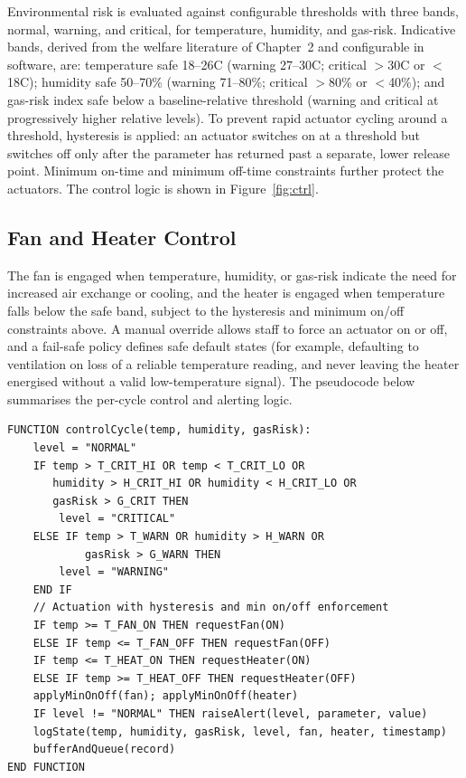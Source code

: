 \documentclass[12pt,a4paper]{report}
\begin{document}
Environmental risk is evaluated against configurable thresholds with three bands, normal, warning, and critical, for temperature, humidity, and gas-risk. Indicative bands, derived from the welfare literature of Chapter~2 and configurable in software, are: temperature safe 18--26\textdegree C (warning 27--30\textdegree C; critical $>$30\textdegree C or $<$18\textdegree C); humidity safe 50--70\% (warning 71--80\%; critical $>$80\% or $<$40\%); and gas-risk index safe below a baseline-relative threshold (warning and critical at progressively higher relative levels). To prevent rapid actuator cycling around a threshold, hysteresis is applied: an actuator switches on at a threshold but switches off only after the parameter has returned past a separate, lower release point. Minimum on-time and minimum off-time constraints further protect the actuators. The control logic is shown in Figure~\ref{fig:ctrl}.

\subsection{Fan and Heater Control}

The fan is engaged when temperature, humidity, or gas-risk indicate the need for increased air exchange or cooling, and the heater is engaged when temperature falls below the safe band, subject to the hysteresis and minimum on/off constraints above. A manual override allows staff to force an actuator on or off, and a fail-safe policy defines safe default states (for example, defaulting to ventilation on loss of a reliable temperature reading, and never leaving the heater energised without a valid low-temperature signal). The pseudocode below summarises the per-cycle control and alerting logic.

\noindent\begin{minipage}{\linewidth}
\begin{lstlisting}[style=pseudocode]
FUNCTION controlCycle(temp, humidity, gasRisk):
    level = "NORMAL"
    IF temp > T_CRIT_HI OR temp < T_CRIT_LO OR
       humidity > H_CRIT_HI OR humidity < H_CRIT_LO OR
       gasRisk > G_CRIT THEN
        level = "CRITICAL"
    ELSE IF temp > T_WARN OR humidity > H_WARN OR
            gasRisk > G_WARN THEN
        level = "WARNING"
    END IF
    // Actuation with hysteresis and min on/off enforcement
    IF temp >= T_FAN_ON THEN requestFan(ON)
    ELSE IF temp <= T_FAN_OFF THEN requestFan(OFF)
    IF temp <= T_HEAT_ON THEN requestHeater(ON)
    ELSE IF temp >= T_HEAT_OFF THEN requestHeater(OFF)
    applyMinOnOff(fan); applyMinOnOff(heater)
    IF level != "NORMAL" THEN raiseAlert(level, parameter, value)
    logState(temp, humidity, gasRisk, level, fan, heater, timestamp)
    bufferAndQueue(record)
END FUNCTION
\end{lstlisting}
\end{minipage}
\end{document}
